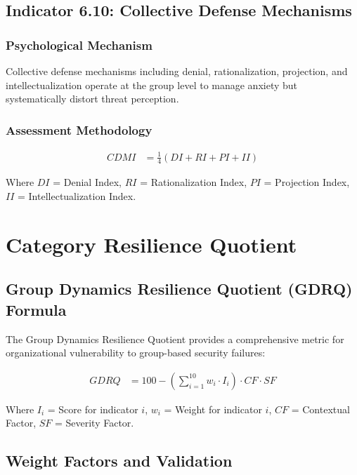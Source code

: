\documentclass[11pt,a4paper]{article}
\begin{document}
\subsection{Indicator 6.10: Collective Defense Mechanisms}

\subsubsection{Psychological Mechanism}

Collective defense mechanisms including denial, rationalization, projection, and intellectualization operate at the group level to manage anxiety but systematically distort threat perception.

\subsubsection{Assessment Methodology}

\begin{align}
CDMI &= \frac{1}{4}(DI + RI + PI + II)
\end{align}

Where $DI$ = Denial Index, $RI$ = Rationalization Index, $PI$ = Projection Index, $II$ = Intellectualization Index.

\section{Category Resilience Quotient}

\subsection{Group Dynamics Resilience Quotient (GDRQ) Formula}

The Group Dynamics Resilience Quotient provides a comprehensive metric for organizational vulnerability to group-based security failures:

\begin{align}
GDRQ &= 100 - \left( \sum_{i=1}^{10} w_i \cdot I_i \right) \cdot CF \cdot SF
\end{align}

Where $I_i$ = Score for indicator $i$, $w_i$ = Weight for indicator $i$, $CF$ = Contextual Factor, $SF$ = Severity Factor.

\subsection{Weight Factors and Validation}
\end{document}
